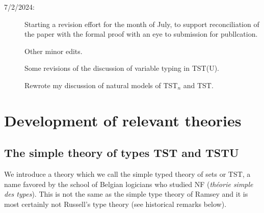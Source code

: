 \documentclass[112pt]{article}
\theoremstyle{definition}
\theoremstyle{remark}
\newenvironment{annot}{\begin{center}\color{blue}\sl}{\end{center}}
\begin{document}
\begin{description}
\item[7/2/2024:]  Starting a revision effort for the month of July, to support reconciliation of the paper with the formal proof with an eye to submission for publlcation.

Other minor edits.

Some revisions of the discussion of variable typing in TST(U).

Rewrote my discussion of natural models of TST$_n$ and TST.















\end{description}


\newpage

\section{Development of relevant theories}



\subsection{The simple theory of types TST and TSTU}

We introduce a theory which we call the simple typed theory of sets or TST, a name favored by the school of Belgian logicians who studied NF ({\em th\'eorie simple des types}).  This is not the same as the simple type theory of Ramsey and it is most certainly not Russell's type theory  (see historical remarks below).

\begin{comment}
\begin{annot}
  Canonicalise uses of `first order' vs.\ `first order'; `typed theory' vs.\ `type theory'; `well-formed' vs.\ `well-formed'; `Freedom of Action' vs.\ `Freedom of Action'; `NF' vs.\ `NF'; {\tt \textbackslash em} vs. double quotes for introducing definitions.

Holmes:  simple typed theory of sets is simply a consistent rhetorical usage of mine.

The others I am standardizing.

\end{annot}
\end{comment}
\end{document}
